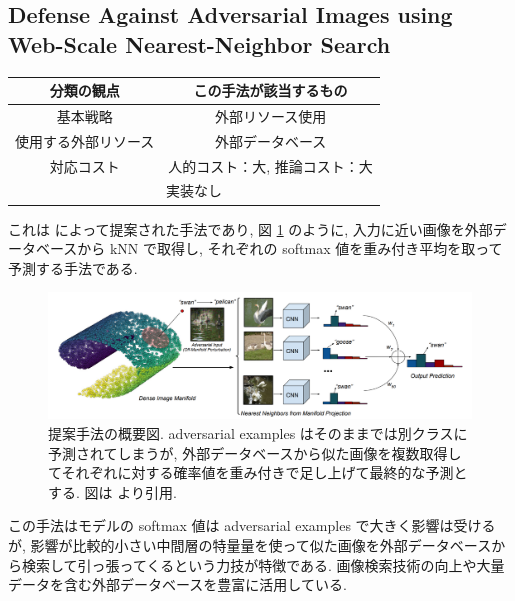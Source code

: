 \subsection{Defense Against Adversarial Images using Web-Scale Nearest-Neighbor Search}
\label{subsec:defense-against-adversarial}

\begin{table}[htbp]
\begin{center}
\begin{tabular}{|c|c|}
\hline
分類の観点 & この手法が該当するもの \\
\hline
基本戦略 & 外部リソース使用 \\
使用する外部リソース & 外部データベース \\
対応コスト & 人的コスト：大, 推論コスト：大 \\
\hline
\multicolumn{2}{|c|}{実装なし} \\
\hline
\end{tabular}
\label{tb:defense-against-adversarial-summary}
\end{center}
\end{table}

これは \cite{dubey2019defense} によって提案された手法であり, 図 \ref{fig:defense-against-adversarial-summary} のように, 入力に近い画像を外部データベースから kNN で取得し, それぞれの softmax 値を重み付き平均を取って予測する手法である.
%
\begin{figure}[htbp]
\begin{center}
\includegraphics[width=16.0cm]{figures/defense-against-adversarial-summary.pdf}
\end{center}
\caption{
提案手法の概要図.
adversarial examples はそのままでは別クラスに予測されてしまうが, 外部データベースから似た画像を複数取得してそれぞれに対する確率値を重み付きで足し上げて最終的な予測とする.
図は \cite{dubey2019defense} より引用.
}
\label{fig:defense-against-adversarial-summary}
\end{figure}
%

この手法はモデルの softmax 値は adversarial examples で大きく影響は受けるが, 影響が比較的小さい中間層の特量量を使って似た画像を外部データベースから検索して引っ張ってくるという力技が特徴である.
画像検索技術の向上や大量データを含む外部データベースを豊富に活用している.

